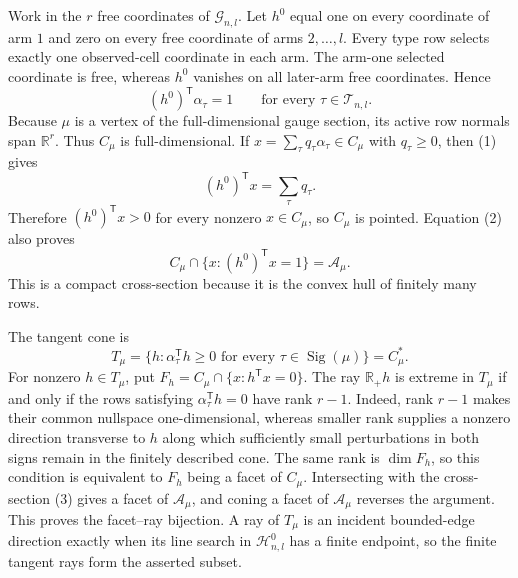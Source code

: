 Work in the \(r\) free coordinates of \(\mathcal G_{n,l}\). Let \(h^0\) equal one on every coordinate of arm \(1\) and zero on every free coordinate of arms \(2,\ldots,l\). Every type row selects exactly one observed-cell coordinate in each arm. The arm-one selected coordinate is free, whereas \(h^0\) vanishes on all later-arm free coordinates. Hence
\[(h^0)^{\mathsf T}\alpha_\tau=1\qquad\text{for every }\tau\in\mathcal T_{n,l}.\tag{1}\]
Because \(\mu\) is a vertex of the full-dimensional gauge section, its active row normals span \(\mathbb R^r\). Thus \(C_\mu\) is full-dimensional. If \(x=\sum_\tau q_\tau\alpha_\tau\in C_\mu\) with \(q_\tau\ge0\), then (1) gives
\[(h^0)^{\mathsf T}x=\sum_\tau q_\tau.\tag{2}\]
Therefore \((h^0)^{\mathsf T}x>0\) for every nonzero \(x\in C_\mu\), so \(C_\mu\) is pointed. Equation (2) also proves
\[C_\mu\cap\{x:(h^0)^{\mathsf T}x=1\}=\mathcal A_\mu.\tag{3}\]
This is a compact cross-section because it is the convex hull of finitely many rows.

The tangent cone is
\[T_\mu=\{h:\alpha_\tau^{\mathsf T}h\ge0\text{ for every }\tau\in\operatorname{Sig}(\mu)\}=C_\mu^*.\tag{4}\]
For nonzero \(h\in T_\mu\), put \(F_h=C_\mu\cap\{x:h^{\mathsf T}x=0\}\). The ray \(\mathbb R_+h\) is extreme in \(T_\mu\) if and only if the rows satisfying \(\alpha_\tau^{\mathsf T}h=0\) have rank \(r-1\). Indeed, rank \(r-1\) makes their common nullspace one-dimensional, whereas smaller rank supplies a nonzero direction transverse to \(h\) along which sufficiently small perturbations in both signs remain in the finitely described cone. The same rank is \(\dim F_h\), so this condition is equivalent to \(F_h\) being a facet of \(C_\mu\). Intersecting with the cross-section (3) gives a facet of \(\mathcal A_\mu\), and coning a facet of \(\mathcal A_\mu\) reverses the argument. This proves the facet--ray bijection. A ray of \(T_\mu\) is an incident bounded-edge direction exactly when its line search in \(\mathcal H^0_{n,l}\) has a finite endpoint, so the finite tangent rays form the asserted subset.


